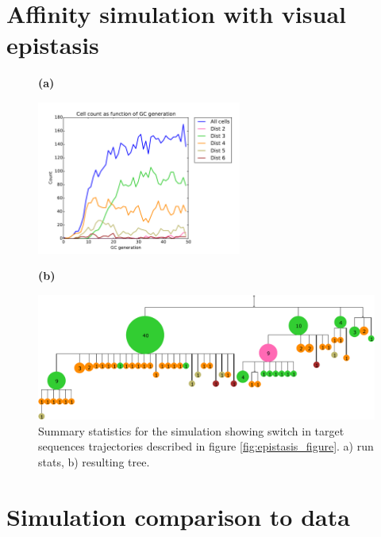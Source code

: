 \section{Affinity simulation with visual epistasis}
\begin{figure}[!ht]
    \textbf{(a)}
    \vspace{-15mm}
    \begin{center}
    \includegraphics[width=0.6\textwidth]{figures/epi_runstats.pdf}
    \end{center}
    \textbf{(b)}
    \vspace{-15mm}
    \begin{center}
    \includegraphics[width=1\textwidth]{figures/epi_collapsed_tree_runstats.pdf}
    \end{center}
    \caption{
        \label{fig:collapsed_epistasis}
        Summary statistics for the simulation showing switch in target sequences trajectories described in figure \ref{fig:epistasis_figure}. a) run stats, b) resulting tree.
        }
\end{figure}






\clearpage
\section{Simulation comparison to data}

